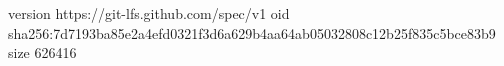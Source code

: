 version https://git-lfs.github.com/spec/v1
oid sha256:7d7193ba85e2a4efd0321f3d6a629b4aa64ab05032808c12b25f835c5bce83b9
size 626416
